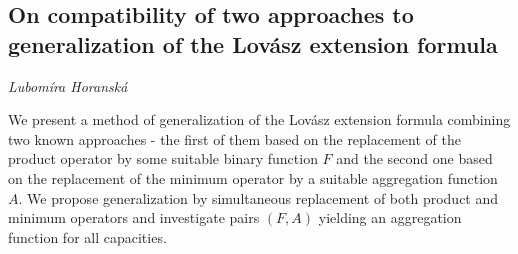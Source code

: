 \documentclass[../booklet.tex]{subfiles}
\begin{document}
\subsection[On compatibility of two approaches to generalization of the Lovász extension formula. {\it Lubomíra Horanská}]{On compatibility of two approaches to generalization of the Lovász extension formula}

\begin{center}
  {\it Lubomíra Horanská}
\end{center}

\vskip 0.8cm


We present a method of generalization of the Lov\'asz extension formula combining two known approaches - the first of them based on the replacement of the product operator by some suitable binary function $F$ and the second one based on the replacement of the minimum operator by a suitable aggregation function $A$. We propose generalization by simultaneous replacement of both product and minimum operators and investigate pairs $(F,A)$ yielding an aggregation function for all capacities. 
\end{document}
